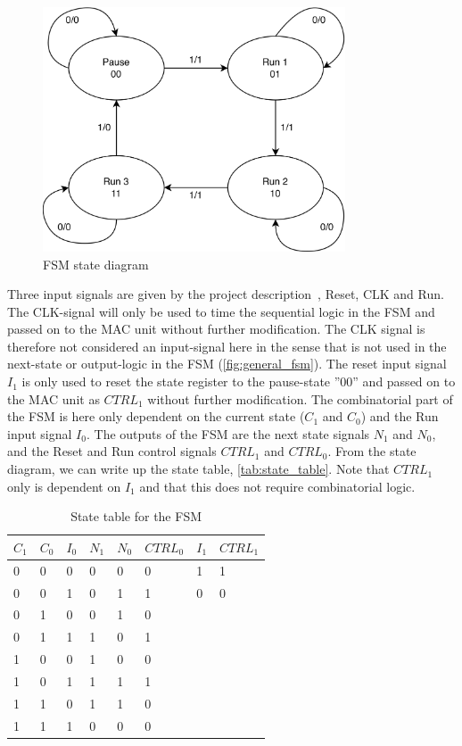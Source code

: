 \begin{figure}[H]
    \centering
    \includegraphics[width=0.8\textwidth]{Figures/FSM-diagram.png}
    \caption{FSM state diagram}
    \label{fig:fsm_diagram}
\end{figure}

Three input signals are given by the project description~\cite{project_description}, Reset, CLK and Run. The CLK-signal
will only be used to time the sequential logic in the FSM and passed on to the MAC unit without
further modification. The CLK signal is therefore not considered an input-signal here in the sense that is not used in the next-state or output-logic in the FSM (\autoref{fig:general_fsm}). The reset input signal $I_1$ is only used to reset the state register to the pause-state ''00'' and passed on to the MAC unit as $CTRL_1$ without further modification. The combinatorial part of the FSM is here only dependent on the current state ($C_1$ and $C_0$) and the Run input signal $I_0$. The outputs of the FSM are the next state signals $N_1$ and $N_0$, and the Reset and Run control signals $CTRL_1$ and $CTRL_0$. From the state diagram, we can write up the state table, \autoref{tab:state_table}. Note that $CTRL_1$ only is dependent on $I_1$ and that this does not require combinatorial logic.

\begin{table}[H]
\caption{State table for the FSM}
\label{tab:state_table}
\centering
\begin{tabular}{|l|l|l|l|l|l||l|l|}
\hline
\rowcolor[HTML]{C0C0C0} 
$C_1$ & $C_0$ & $I_0$ & $N_1$ & $N_0$ & $CTRL_0$ & $I_1$ & $CTRL_1$\\
\hline
0  & 0  & 0  & 0   & 0   & 0 & 1 & 1\\ 
\hline
0  & 0  & 1  & 0   & 1   & 1 & 0 & 0\\ 
\hline
0  & 1  & 0  & 0   & 1   & 0 \\ 
\cline{1-6}
0  & 1  & 1  & 1   & 0   & 1 \\ 
\cline{1-6}
1  & 0  & 0  & 1   & 0   & 0 \\ 
\cline{1-6}
1  & 0  & 1  & 1   & 1   & 1 \\ 
\cline{1-6}
1  & 1  & 0  & 1   & 1   & 0 \\ 
\cline{1-6}
1  & 1  & 1  & 0   & 0   & 0 \\ 
\cline{1-6}

\end{tabular}
\end{table}

